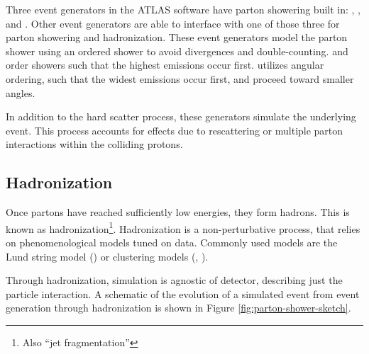 Three event generators in the ATLAS software have parton showering built in: \PYTHIA, \HERWIG, and \SHERPA. Other event generators are able to interface with one of those three for parton showering and hadronization. These event generators model the parton shower using an ordered shower to avoid divergences and double-counting. \PYTHIA and \SHERPA order showers such that the highest \pt emissions occur first. \HERWIG utilizes angular ordering, such that the widest emissions occur first, and proceed toward smaller angles.

In addition to the hard scatter process, these generators simulate the underlying event. This process accounts for effects due to rescattering or multiple parton interactions within the colliding protons.

\subsection{Hadronization} \label{ssec:hadronization}
Once partons have reached sufficiently low energies, they form hadrons. This is known as hadronization\footnote{Also ``jet fragmentation''}. Hadronization is a non-perturbative process, that relies on phenomenological models tuned on data. Commonly used models are the Lund string model \cite{lund-string} (\PYTHIA) or clustering models \cite{clustering-hadronization} (\HERWIG, \SHERPA).

Through hadronization, simulation is agnostic of detector, describing just the particle interaction. A schematic of the evolution of a simulated event from event generation through hadronization is shown in Figure \ref{fig:parton-shower-sketch}.

